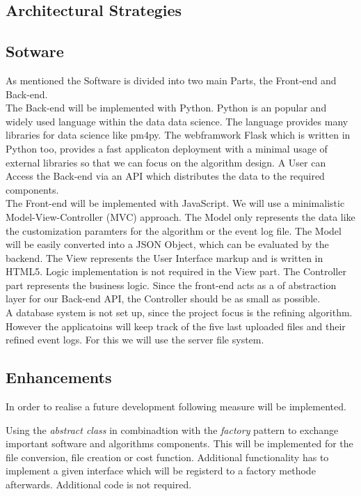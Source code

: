 \documentclass[notitlepage]{article}
\begin{document}
\begin{flushleft}
\section{Architectural Strategies}

\subsection{Sotware}
As mentioned the Software is divided into two main Parts, the Front-end and Back-end.\\ 
\medskip
The Back-end will be implemented with Python.
Python is an popular and widely used language within the data data science. The language provides many libraries for data science like pm4py.
The webframwork Flask which is written in Python too, provides a fast applicaton deployment with a minimal usage of external libraries so that we can 
focus on the algorithm design. A User can Access the Back-end via an API which distributes the data to the required components.\\
\medskip
The Front-end will be implemented with JavaScript. We will use a minimalistic Model-View-Controller (MVC) approach. The Model only represents the data like 
the customization paramters for the algorithm or the event log file. The Model will be easily converted into a JSON Object, which can be evaluated by the backend.
The View represents the User Interface markup and is written in HTML5. Logic implementation is not required in the View part. The Controller part represents 
the business logic. Since the front-end acts as a of abstraction layer for our Back-end API, the Controller should be as small as possible.\\
\medskip
A database system is not set up, since the project focus is the refining algorithm. However the applicatoins will keep track of the five last uploaded files and 
their refined event logs. For this we will use the server file system. 

\subsection{Enhancements}
In order to realise a future development following measure will be implemented.

Using the \textit{abstract class} in combinadtion with the \textit{factory} pattern to exchange important software and algorithms components. 
This will be implemented for the file conversion, file creation or cost function. Additional functionality has to implement a given interface which will be registerd 
to a factory methode afterwards. Additional code is not required. 


\end{flushleft}
\end{document}
